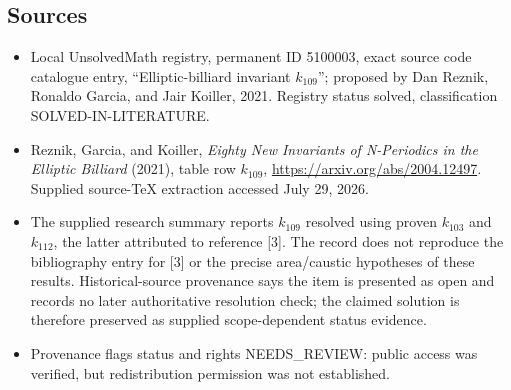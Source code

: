 \documentclass[11pt]{article}
\begin{document}
\subsection{Sources}
\begin{itemize}
\item Local UnsolvedMath registry, permanent ID 5100003, exact source code catalogue entry, ``Elliptic-billiard invariant $k_{109}$''; proposed by Dan Reznik, Ronaldo Garcia, and Jair Koiller, 2021. Registry status solved, classification SOLVED-IN-LITERATURE.
\item Reznik, Garcia, and Koiller, \emph{Eighty New Invariants of N-Periodics in the Elliptic Billiard} (2021), table row $k_{109}$, \url{https://arxiv.org/abs/2004.12497}. Supplied source-TeX extraction accessed July 29, 2026.
\item The supplied research summary reports $k_{109}$ resolved using proven $k_{103}$ and $k_{112}$, the latter attributed to reference [3]. The record does not reproduce the bibliography entry for [3] or the precise area/caustic hypotheses of these results. Historical-source provenance says the item is presented as open and records no later authoritative resolution check; the claimed solution is therefore preserved as supplied scope-dependent status evidence.
\item Provenance flags status and rights NEEDS\_REVIEW: public access was verified, but redistribution permission was not established.
\end{itemize}
\end{document}
